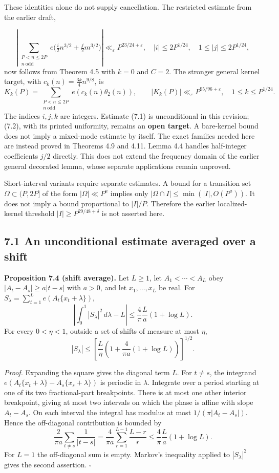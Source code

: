 \documentclass[11pt,a4paper]{article}
\begin{document}
These identities alone do not supply cancellation. The restricted
estimate from the earlier draft,

\[
\left|\sum_{\substack{P<n\le2P\\n\ \mathrm{odd}}}
e\bigl(\tfrac i2 n^{3/2}+\tfrac j2m^{3/2}\bigr)\right|
\ll_\varepsilon P^{23/24+\varepsilon},
\quad |i|\le2P^{1/24},\quad1\le|j|\le2P^{1/24},
\tag{7.1}
\] now follows from Theorem 4.5 with \(k=0\) and \(C=2\). The stronger
general kernel target, with \(c_k(n)=\tfrac{3k}{4}n^{9/8}\), is \[
K_k(P)=\sum_{\substack{P<n\le2P\\n\ \mathrm{odd}}}
e(c_k(n)\theta_2(n)),
\qquad |K_k(P)|\ll_\varepsilon P^{95/96+\varepsilon},
\quad1\le k\le P^{1/24}.
\tag{7.2}
\] The indices \(i,j,k\) are integers. Estimate (7.1) is unconditional
in this revision; (7.2), with its printed uniformity, remains an
\textbf{open target}. A bare-kernel bound does not imply a mixed-mode
estimate by itself. The exact families needed here are instead proved in
Theorems 4.9 and 4.11. Lemma 4.4 handles half-integer coefficients
\(j/2\) directly. This does not extend the frequency domain of the
earlier general decorated lemma, whose separate applications remain
unproved.

Short-interval variants require separate estimates. A bound for a
transition set \(\Omega\subset(P,2P]\) of the form \(|\Omega|\ll P^a\)
implies only \(|\Omega\cap I|\le\min(|I|,O(P^a))\). It does not imply a
bound proportional to \(|I|/P\). Therefore the earlier localized-kernel
threshold \(|I|\ge P^{29/48+\delta}\) is not asserted here.

\subsection{7.1 An unconditional estimate averaged over a
shift}\label{an-unconditional-estimate-averaged-over-a-shift}


\textbf{Proposition 7.4 (shift average).} Let \(L\ge1\), let
\(A_1<\cdots<A_L\) obey \(|A_t-A_s|\ge a|t-s|\) with \(a>0\), and let
\(x_1,\ldots,x_L\) be real. For
\(S_\lambda=\sum_{t=1}^{L}e(A_t\{x_t+\lambda\})\), \[
\left|\int_0^1|S_\lambda|^2\,d\lambda-L\right|
\le\frac4\pi\frac La(1+\log L).
\tag{7.3}
\] For every \(0<\eta<1\), outside a set of shifts of measure at most
\(\eta\), \[
|S_\lambda|\le
\left[\frac L\eta\left(1+\frac4{\pi a}(1+\log L)\right)\right]^{1/2}.
\]

\emph{Proof.} Expanding the square gives the diagonal term \(L\). For
\(t\ne s\), the integrand \(e(A_t\{x_t+\lambda\}-A_s\{x_s+\lambda\})\)
is periodic in \(\lambda\). Integrate over a period starting at one of
its two fractional-part breakpoints. There is at most one other interior
breakpoint, giving at most two intervals on which the phase is affine
with slope \(A_t-A_s\). On each interval the integral has modulus at
most \(1/(\pi|A_t-A_s|)\). Hence the off-diagonal contribution is
bounded by \[
\frac{2}{\pi a}\sum_{t\ne s}\frac1{|t-s|}
=\frac4{\pi a}\sum_{r=1}^{L-1}\frac{L-r}{r}
\le\frac4\pi\frac La(1+\log L).
\] For \(L=1\) the off-diagonal sum is empty. Markov's inequality
applied to \(|S_\lambda|^2\) gives the second assertion. \(\square\)
\end{document}

